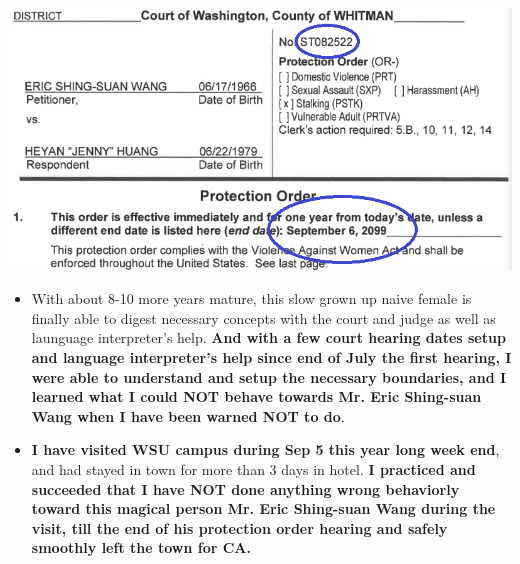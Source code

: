 \documentclass[9pt, b5paper]{article}
\begin{document}
\includegraphics[width=.9\linewidth]{./pic/dearCousin_20220919_222725.png}
\begin{itemize}
\item With about 8-10 more years mature, this slow grown up naive female is finally able to digest necessary concepts with the court and judge as well as launguage interpreter's help. \textbf{And with a few court hearing dates setup and language interpreter's help since end of July the first hearing, I were able to understand and setup the necessary boundaries, and I learned what I could NOT behave towards Mr. Eric Shing-suan Wang when I have been warned NOT to do}.
\item \textbf{I have visited WSU campus during Sep 5 this year long week end}, and had stayed in town for more than 3 days in hotel. \textbf{I practiced and succeeded that I have NOT done anything wrong behaviorly toward this magical person Mr. Eric Shing-suan Wang during the visit, till the end of his protection order hearing and safely smoothly left the town for CA.}
\end{itemize}
\end{document}
